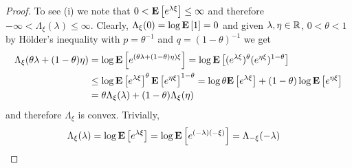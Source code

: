 \begin{proof}
To see (i) we note that $0 < \textbf{E}\left[e^{\lambda \xi}\right] \leq \infty$ and therefore $-\infty < \Lambda_\xi(\lambda) \leq \infty$.  Clearly, $\Lambda_\xi(0) = \log \textbf{E}\left[1\right] = 0$ and given $\lambda, \eta \in \mathbb{R}$, $0 < \theta < 1$ by
H\"{o}lder's inequality with $p = \theta^{-1}$ and $q=(1-\theta)^{-1}$ we get
\begin{align*}
\Lambda_\xi(\theta \lambda + (1-\theta) \eta) &= \log \textbf{E}\left[e^{(\theta \lambda + (1-\theta) \eta) \xi}\right] = \log \textbf{E}\left[(e^{\lambda \xi})^\theta (e^{\eta \xi})^{1-\theta}\right] \\
&\leq \log \textbf{E}\left[e^{\lambda \xi}\right]^\theta \textbf{E}\left[e^{\eta \xi}\right]^{1-\theta} = \log \theta\textbf{E}\left[e^{\lambda \xi}\right] + (1-\theta) \log \textbf{E}\left[e^{\eta \xi}\right] \\
&= \theta \Lambda_\xi(\lambda) + (1-\theta) \Lambda_\xi(\eta)
\end{align*}
and therefore $\Lambda_\xi$ is convex.  Trivially, 
\begin{align*}
\Lambda_\xi(\lambda) &= \log \textbf{E}\left[e^{\lambda \xi}\right] = \log \textbf{E}\left[e^{(-\lambda)(- \xi)}\right] = \Lambda_{-\xi}(-\lambda) 
\end{align*}


\end{proof}
